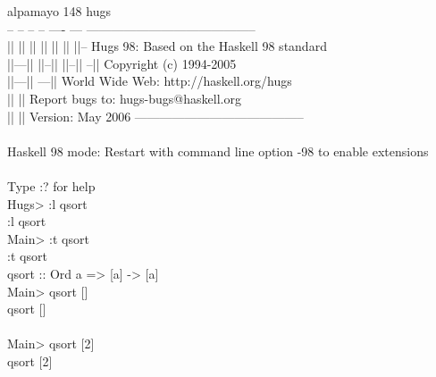 \documentclass[11pt]{article}
\begin{document}
\begin{program*}
\> alpamayo 148%
\> hugs                                       \\
\> --   -- --  --  ----   ---      -----------------------------------------                                       \\
\> ||   || ||  || ||  || ||--      Hugs 98: Based on the Haskell 98 standard                                       \\
\> ||---|| ||--|| ||--||  --||     Copyright (c) 1994-2005                                       \\
\> ||---||         ---||           World Wide Web: http://haskell.org/hugs                                       \\
\> ||   ||                         Report bugs to: hugs-bugs@haskell.org                                       \\
\> ||   || Version: May 2006       -----------------------------------------                                        \\
\>                                        \\
\> Haskell 98 mode: Restart with command line option -98 to enable extensions                                       \\
\>                                        \\
\> Type :? for help                                       \\
\> Hugs> :l qsort                                       \\
\> :l qsort                                       \\
\> Main> :t qsort                                       \\
\> :t qsort                                       \\
\> qsort :: Ord a => [a] -> [a]                                       \\
\> Main> qsort []                                       \\
\> qsort []                                       \\
\> []                                       \\
\> Main> qsort [2]                                       \\
\> qsort [2]                                       \\
\> [2]                                       \\

\end{program*}
\end{document}
